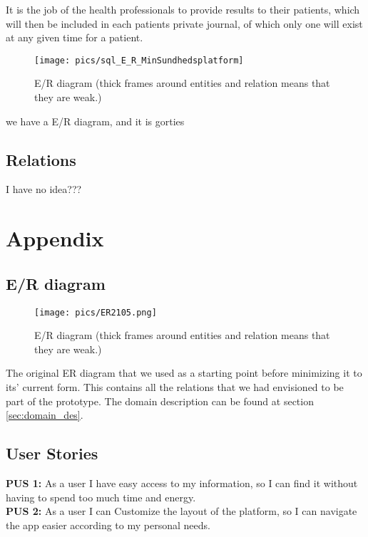 \documentclass[a4paper,11pt]{article}
\begin{document}
It is the job of the health professionals to provide results to their patients, which will then be included in each patients private journal, of which only one will exist at any given time for a patient.\\


\begin{figure}[H]
    \centering
    \texttt{[image: pics/sql\_E\_R\_MinSundhedsplatform]}
    \caption{E/R diagram (thick frames around entities and relation means that they are weak.)}
    \label{fig:er}
\end{figure}


we have a E/R diagram, and it is gorties 
\subsection{Relations}
I have no idea???




\section{Appendix}
\subsection{E/R diagram}
\begin{figure}[H]
    \centering
    \texttt{[image: pics/ER2105.png]}
    \caption{E/R diagram (thick frames around entities and relation means that they are weak.)}
    \label{fig:er}
\end{figure}

The original ER diagram that we used as a starting point before minimizing it to its' current form. This contains all the relations that we had envisioned to be part of the prototype. The domain description can be found at section \ref{sec:domain_des}.

\subsection{User Stories}

\textbf{PUS 1:} As a user I have easy access to my information, so I can find it without having to spend too much time and energy.\\

\textbf{PUS 2:} As a user I can Customize the layout of the platform, so I can navigate the app easier according to my personal needs.\\
\end{document}
